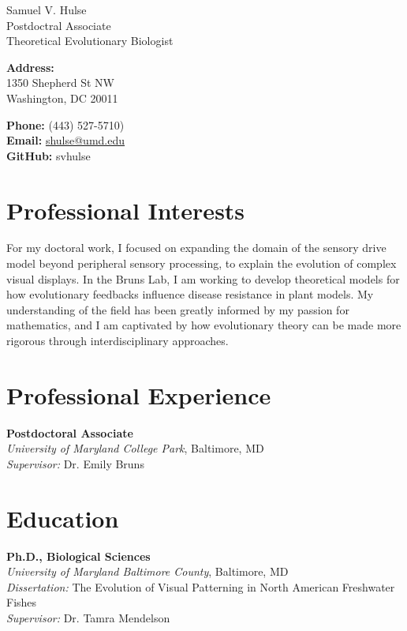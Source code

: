 \documentclass[10pt, a4paper]{article}
\newcommand{\note}[1]{\marginnote{\small #1}}
\begin{document}
\pagecolor{light-gray}

{\LARGE Samuel V. Hulse}\\[.4cm]
{\large Postdoctral Associate\\
Theoretical Evolutionary Biologist\\[0.5cm]}

\begin{multicols}{2}
  \textbf{Address:}\\
  1350 Shepherd St NW\\
  Washington, DC 20011\\[0.5cm]
  \columnbreak

  \textbf{Phone:} (443) 527-5710)\\
  \textbf{Email:} \href{mailto:$email$}{shulse@umd.edu}\\
  \textbf{GitHub:} svhulse
\end{multicols}

\section*{Professional Interests}
For my doctoral work, I focused on expanding the domain of the sensory drive model beyond peripheral
sensory processing, to explain the evolution of complex visual displays. In the Bruns Lab, I am working to
develop theoretical models for how evolutionary feedbacks influence disease resistance in plant models.
My understanding of the field has been greatly informed by my passion for mathematics, and I am
captivated by how evolutionary theory can be made more rigorous through interdisciplinary approaches.\\

\section*{Professional Experience}
\note{2021 - Curr.} \textbf{Postdoctoral Associate}\\
\emph{University of Maryland College Park}, Baltimore, MD\\
\emph{Supervisor:} Dr. Emily Bruns\\

\section*{Education}
\note{2021} \textbf{Ph.D., Biological Sciences}\\
\emph{University of Maryland Baltimore County}, Baltimore, MD\\
\emph{Dissertation:} The Evolution of Visual Patterning in North American Freshwater Fishes\\
\emph{Supervisor:} Dr. Tamra Mendelson\\[.2cm]
\end{document}

